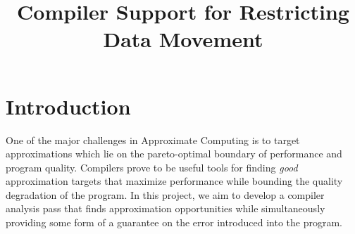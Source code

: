 \documentclass[12pt,conference]{IEEEtran}
\begin{document}
%
\title{Compiler Support for Restricting Data Movement}


\author{
\and
{}
}



\maketitle






%
\IEEEpeerreviewmaketitle



\section{Introduction}

One of the major challenges in Approximate Computing is 
to target approximations which lie on the pareto-optimal
boundary of performance and program quality. Compilers prove
to be useful tools for finding \emph{good} approximation 
targets that maximize performance while bounding the
quality degradation of the program. In this project, we aim
to develop a compiler analysis pass that finds approximation
opportunities while simultaneously providing some form of a guarantee on the
error introduced into the program.
\end{document}
